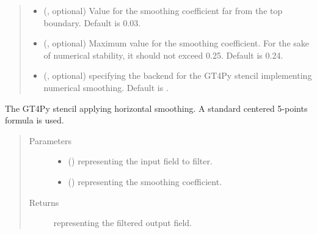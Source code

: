 \documentclass[letterpaper,10pt,english]{sphinxmanual}
\begin{document}
\begin{fulllineitems}
\begin{fulllineitems}
\begin{quote}
\begin{description}
\begin{itemize}
\item {} 
 (, optional) \textendash{} Value for the smoothing coefficient far from the top boundary. Default is 0.03.

\item {} 
 (, optional) \textendash{} Maximum value for the smoothing coefficient. For the sake of numerical stability, it should not
exceed 0.25. Default is 0.24.

\item {} 
 (, optional) \textendash{}  specifying the backend for the GT4Py stencil implementing numerical
smoothing. Default is .

\end{itemize}

\end{description}\end{quote}

\end{fulllineitems}


\begin{fulllineitems}
\label{\detokenize{api:dycore.horizontal_smoothing.HorizontalSmoothingSecondOrderXYZ._stencil_defs}}
The GT4Py stencil applying horizontal smoothing. A standard centered 5-points formula is used.
\begin{quote}\begin{description}
\item[{Parameters}] \leavevmode\begin{itemize}
\item {} 
 () \textendash{}  representing the input field to filter.

\item {} 
 () \textendash{}  representing the smoothing coefficient.

\end{itemize}

\item[{Returns}] \leavevmode
{} representing the filtered output field.


\end{description}
\end{quote}
\end{fulllineitems}
\end{fulllineitems}
\end{document}
